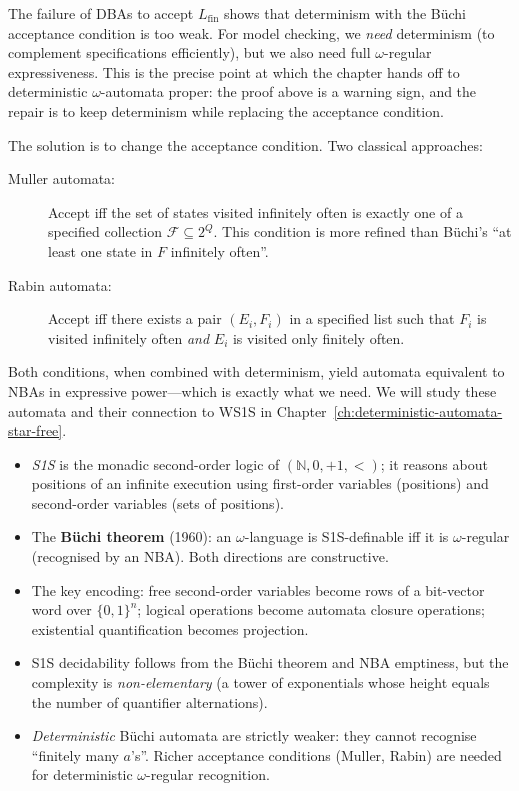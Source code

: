 The failure of DBAs to accept $L_{\mathrm{fin}}$ shows that determinism
with the Büchi acceptance condition is too weak.  For model checking, we
\emph{need} determinism (to complement specifications efficiently), but we
also need full $\omega$-regular expressiveness.  This is the precise point
at which the chapter hands off to deterministic $\omega$-automata proper:
the proof above is a warning sign, and the repair is to keep determinism
while replacing the acceptance condition.

The solution is to change the acceptance condition.  Two classical approaches:

\begin{description}
  \item[Muller automata:] Accept iff the set of states visited infinitely
        often is exactly one of a specified collection $\mathcal{F}
        \subseteq 2^Q$.  This condition is more refined than Büchi's
        ``at least one state in $F$ infinitely often''.

  \item[Rabin automata:] Accept iff there exists a pair $(E_i, F_i)$ in a
        specified list such that $F_i$ is visited infinitely often
        \emph{and} $E_i$ is visited only finitely often.
\end{description}

Both conditions, when combined with determinism, yield automata equivalent
to NBAs in expressive power---which is exactly what we need.  We will
study these automata and their connection to WS1S in
Chapter~\ref{ch:deterministic-automata-star-free}.

\begin{summarybox}
\begin{itemize}[nosep]
  \item \emph{S1S} is the monadic second-order logic of
    $(\mathbb{N},0,{+1},{<})$; it reasons about positions of an
    infinite execution using first-order variables (positions) and
    second-order variables (sets of positions).
  \item The \textbf{B\"uchi theorem} (1960): an $\omega$-language is
    S1S-definable iff it is $\omega$-regular (recognised by an NBA).
    Both directions are constructive.
  \item The key encoding: free second-order variables become rows of a
    bit-vector word over $\{0,1\}^n$; logical operations become automata
    closure operations; existential quantification becomes projection.
  \item S1S decidability follows from the B\"uchi theorem and NBA
    emptiness, but the complexity is \emph{non-elementary} (a tower of
    exponentials whose height equals the number of quantifier
    alternations).
  \item \emph{Deterministic} B\"uchi automata are strictly weaker: they
    cannot recognise ``finitely many $a$'s''.  Richer acceptance
    conditions (Muller, Rabin) are needed for deterministic
    $\omega$-regular recognition.
\end{itemize}
\end{summarybox}

